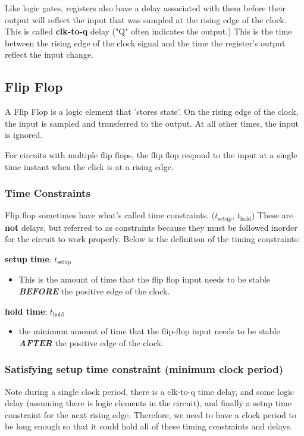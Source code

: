 \documentclass[12pt]{article}
\begin{document}
Like logic gates, registers also have a delay associated with them before their output will reflect the input that was sampled at the rising edge of the clock. This is called \textbf{clk-to-q} delay ("Q" often indicates the output.) This is the time between the rising edge of the clock signal and the time the register's output reflect the input change.

\subsection*{Flip Flop}
A Flip Flop is a logic element that 'stores state'.
On the rising edge of the clock, the input is sampled and transferred to the output. At all other times, the input is ignored.

For circuits with multiple flip flops, the flip flop respond to the input at a single time instant when the click is at a rising edge.

\subsubsection*{Time Constraints}
Flip flop sometimes have what's called time constraints. ($t_{\text{setup}}$, $t_{\text{hold}}$) These are \textbf{not} delays, but referred to as constraints because they must be followed inorder for the circuit to work properly. Below is the definition of the timing constraints:

\textbf{setup time}: $t_{\text{setup}}$
\begin{itemize}
    \item This is the amount of time that the flip flop input needs to be stable \emph{\textbf{BEFORE}} the positive edge of the clock.
\end{itemize}


\textbf{hold time}: $t_{\text{hold}}$
\begin{itemize}
    \item the minimum amount of time that the flip-flop input needs to be stable \emph{\textbf{AFTER}} the positive edge of the clock.
\end{itemize}

\subsubsection*{Satisfying setup time constraint (minimum clock period)}
Note during a single clock period, there is a clk-to-q time delay, and some logic delay (assuming there is logic elements in the circuit), and finally a setup time constraint for the next rising edge. Therefore, we need to have a clock period to be long enough so that it could hold all of these timing constraints and delays.
\end{document}
